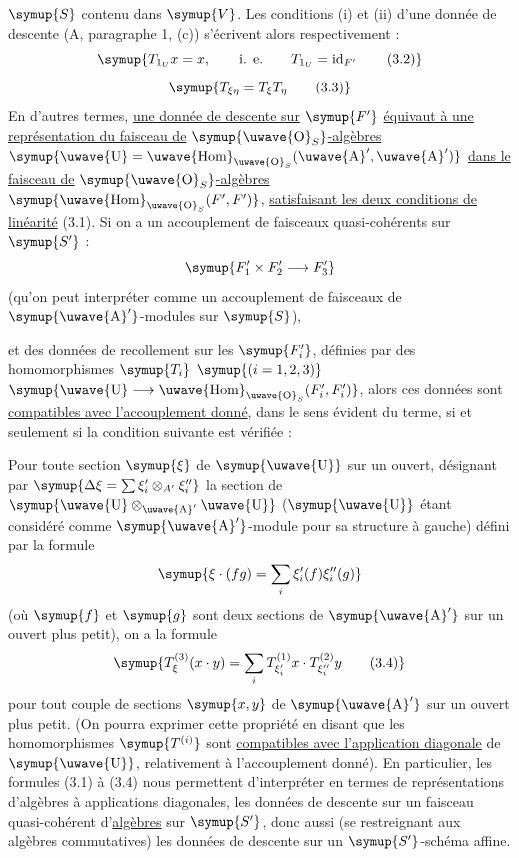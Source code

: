 $\symup{S}$ contenu dans $\symup{V}$. Les conditions (i) et (ii) d'une donnée de descente
(A, paragraphe 1, (c)) s'écrivent alors respectivement :
\begin{equation}
  \symup{T_{1_U}x=x,
  \qquad\text{i. e.}\qquad
  T_{1_U}=\operatorname{id}_{F'}
  \tag{3.2}}
\end{equation}
\begin{equation}
  \symup{T_{\xi\eta}=T_\xi T_\eta
  \tag{3.3}}
\end{equation}
En d'autres termes, \uline{une donnée de descente sur} $\symup{F'}$ \uline{équivaut à une représentation du faisceau de} $\symup{\text{\uwave{O}}_S}$\uline{-algèbres} $\symup{\text{\uwave{U}}=\mathop{\text{\uwave{Hom}}}\nolimits_{\text{\uwave{O}}_S}(\text{\uwave{A}}',\text{\uwave{A}}')}$ \uline{dans le faisceau de} $\symup{\text{\uwave{O}}_S}$\uline{-algèbres} $\symup{\mathop{\text{\uwave{Hom}}}\nolimits_{\text{\uwave{O}}_S}(F',F')}$, \uline{satisfaisant les deux conditions de linéarité} (3.1). Si on a un accouplement de faisceaux quasi-cohérents sur
$\symup{S'}$ :
\[
  \symup{F'_1\times F'_2\longrightarrow F'_3}
\]
(qu'on peut interpréter comme un accouplement de faisceaux de
$\symup{\text{\uwave{A}}'}$-modules sur $\symup{S}$),

et des données de recollement sur les $\symup{F'_i}$, définies par des homomorphismes
$\symup{T_i}$ $\symup{(i=1,2,3)}$ $\symup{\text{\uwave{U}}\longrightarrow\mathop{\text{\uwave{Hom}}}\nolimits_{\text{\uwave{O}}_S}(F'_i,F'_i)}$,
alors ces données sont \uline{compatibles avec l'accouplement donné}, dans le sens
évident du terme, si et seulement si la condition suivante est vérifiée :

Pour toute section $\symup{\xi}$ de $\symup{\text{\uwave{U}}}$ sur un ouvert, désignant par
$\symup{\Delta\xi=\sum\xi'_i\otimes_{A'}\xi''_i}$
la section de $\symup{\text{\uwave{U}}\otimes_{\text{\uwave{A}}'}\text{\uwave{U}}}$ ($\symup{\text{\uwave{U}}}$ étant
considéré comme $\symup{\text{\uwave{A}}'}$-module pour sa structure à gauche) défini par la
formule
\[
  \symup{\xi\mathbin{\cdot}(fg)=\sum_i\xi'_i(f)\xi''_i(g)}
\]
(où $\symup{f}$ et $\symup{g}$ sont deux sections de $\symup{\text{\uwave{A}}'}$ sur un ouvert plus petit),
on a la formule
\begin{equation}
  \symup{T^{(3)}_\xi(x\mathbin{\cdot}y)
  =\sum_iT^{(1)}_{\xi'_i}x\mathbin{\cdot}T^{(2)}_{\xi''_i}y
  \tag{3.4}}
\end{equation}
pour tout couple de sections $\symup{x,y}$ de $\symup{\text{\uwave{A}}'}$ sur un ouvert
plus petit. (On pourra exprimer cette
propriété en disant que les homomorphismes $\symup{T^{(i)}}$ sont \uline{compatibles avec l'application diagonale} de $\symup{\text{\uwave{U}}}$, relativement à l'accouplement donné).
En particulier, les formules (3.1) à (3.4) nous permettent d'interpréter en
termes de représentations d'algèbres à applications diagonales, les données de
descente sur un faisceau quasi-cohérent d'\uline{algèbres} sur $\symup{S'}$, donc aussi (se
restreignant aux algèbres commutatives) les données de descente sur un
$\symup{S'}$-schéma affine.

